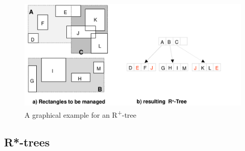 \documentclass{article}
\begin{document}
\begin{figure}[h]
    \centering
    \includegraphics[width=\textwidth]{r+tree.png}
    \caption{A graphical example for an R\textsuperscript{+}-tree}
    \label{fig:r+-tree}
\end{figure}

\subsection{R*-trees}
\end{document}

